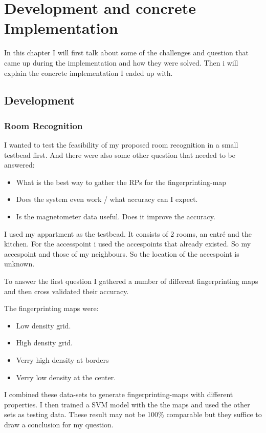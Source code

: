 \chapter{Development and concrete Implementation}

\label{Chapter4}

In this chapter I will first talk about some of the challenges and question that came up during the implementation and how they were solved. Then i will explain the concrete implementation I ended up with.

\section{Development}

\subsection{Room Recognition}

I wanted to test the feasibility of my proposed room recognition in a small testbead first. And there were also some other question that needed to be answered:
\begin{itemize}
\item What is the best way to gather the RPs for the fingerprinting-map
\item Does the system even work / what accuracy can I expect.
\item Is the magnetometer data useful. Does it improve the accuracy.
\end{itemize}
I used my appartment as the testbead. It consists of 2 rooms, an entré and the kitchen. For the accesspoint i used the accespoints that already existed. So my accespoint and those of my neighbours. So the location of the accespoint is unknown.

To answer the first question I gathered a number of different fingerprinting maps and then cross validated their accuracy.

The fingerprinting maps were:

\begin{itemize}
\item Low density grid.
\item High density grid.
\item Verry high density at borders
\item Verry low density at the center.
\end{itemize}

I combined these data-sets to generate fingerprinting-maps with different properties. I then trained a SVM model with the the maps and used the other sets as testing data. These result may not be 100\% comparable but they suffice to draw a conclusion for my question.

